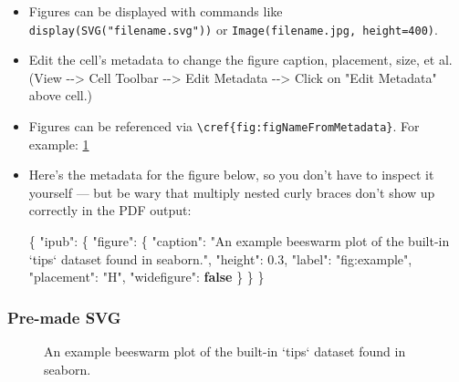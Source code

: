 \documentclass[10pt,parskip=half,
	toc=sectionentrywithdots,
	bibliography=totocnumbered,
	captions=tableheading,
    numbers=noendperiod,
    headings=standardclasses]{scrartcl}
\newenvironment{Shaded}{}{}
\newcommand{\KeywordTok}[1]{\textcolor[rgb]{0.00,0.44,0.13}{\textbf{{#1}}}}
\newcommand{\DataTypeTok}[1]{\textcolor[rgb]{0.56,0.13,0.00}{{#1}}}
\newcommand{\FloatTok}[1]{\textcolor[rgb]{0.25,0.63,0.44}{{#1}}}
\newcommand{\StringTok}[1]{\textcolor[rgb]{0.25,0.44,0.63}{{#1}}}
\newcommand{\FunctionTok}[1]{\textcolor[rgb]{0.02,0.16,0.49}{{#1}}}
\begin{document}
\begin{itemize}
\item
  Figures can be displayed with commands like
  \texttt{display(SVG("filename.svg"))} or
  \texttt{Image(\textquotesingle{}filename.jpg\textquotesingle{},\ height=400)}.
\item
  Edit the cell's metadata to change the figure caption, placement,
  size, et al. (View -\/-\textgreater{} Cell Toolbar -\/-\textgreater{}
  Edit Metadata -\/-\textgreater{} Click on "Edit Metadata" above cell.)
\item
  Figures can be referenced via
  \texttt{\textbackslash{}cref\{fig:figNameFromMetadata\}}. For example:
  \cref{fig:example}
\item
  Here's the metadata for the figure below, so you don't have to inspect
  it yourself --- but be wary that multiply nested curly braces don't
  show up correctly in the PDF output:

\begin{Shaded}
\begin{Highlighting}[]
\FunctionTok{\{}
\DataTypeTok{"ipub"}\FunctionTok{:} \FunctionTok{\{}
    \DataTypeTok{"figure"}\FunctionTok{:} \FunctionTok{\{}
        \DataTypeTok{"caption"}\FunctionTok{:} \StringTok{"An example beeswarm plot of the built-in `tips` dataset found in seaborn."}\FunctionTok{,}
        \DataTypeTok{"height"}\FunctionTok{:} \FloatTok{0.3}\FunctionTok{,}
        \DataTypeTok{"label"}\FunctionTok{:} \StringTok{"fig:example"}\FunctionTok{,}
        \DataTypeTok{"placement"}\FunctionTok{:} \StringTok{"H"}\FunctionTok{,}
        \DataTypeTok{"widefigure"}\FunctionTok{:} \KeywordTok{false}
    \FunctionTok{\}}
\FunctionTok{\}}
\FunctionTok{\}}
\end{Highlighting}
\end{Shaded}
\end{itemize}

\subsubsection{Pre-made SVG}\label{pre-made-svg}

\begin{figure}[H]\begin{center}\end{center}\caption{An example beeswarm plot of the built-in `tips` dataset found in seaborn.}\label{fig:example}
    \end{figure}
\end{document}
